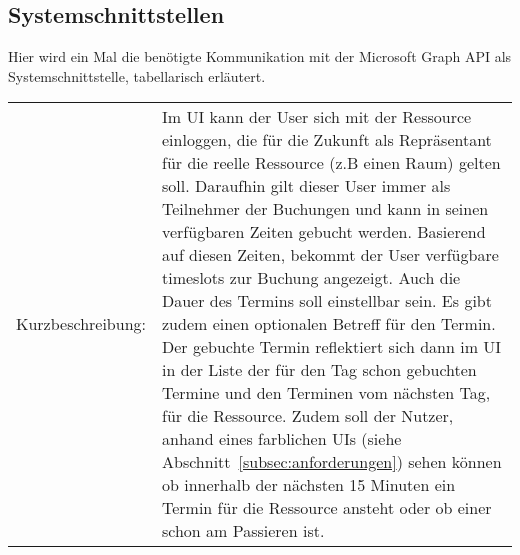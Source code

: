 \subsection{Systemschnittstellen}\label{subsec:systemschnittstellen}
Hier wird ein Mal die benötigte Kommunikation mit der Microsoft Graph API als Systemschnittstelle, tabellarisch erläutert.
\newline
\footnotesize
\begin{tabularx}{\textwidth}{|X|X|}
    \hline
    \caption{Termin buchen}
    \label{tab:TerminBuchen}
 Kurzbeschreibung: & Im UI kann der User sich mit der Ressource einloggen, die für die Zukunft als Repräsentant für die reelle Ressource (z.B einen Raum) gelten soll.
    Daraufhin gilt dieser User immer als Teilnehmer der Buchungen und kann in seinen verfügbaren Zeiten gebucht werden.
    Basierend auf diesen Zeiten, bekommt der User verfügbare timeslots zur Buchung angezeigt.
    Auch die Dauer des Termins soll einstellbar sein.
    Es gibt zudem einen optionalen Betreff für den Termin.
    Der gebuchte Termin reflektiert sich dann im UI in der Liste der für den Tag schon gebuchten Termine und den Terminen vom nächsten Tag, für die Ressource.
    Zudem soll der Nutzer, anhand eines farblichen UIs (siehe Abschnitt~\ref{subsec:anforderungen}) sehen können ob innerhalb der nächsten 15 Minuten ein Termin für die Ressource ansteht oder ob einer schon am Passieren ist.


\end{tabularx}
